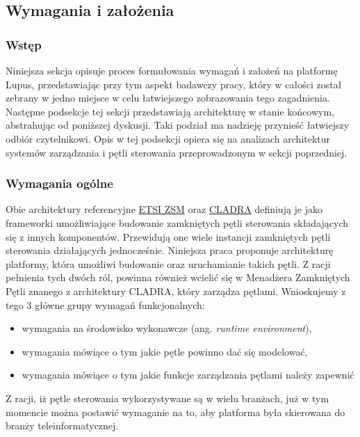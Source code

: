 \subsection{Wymagania i założenia}\label{sec:32}

\subsubsection{Wstęp}

Niniejsza sekcja opisuje proces formułowania wymagań i założeń na platformę Lupus, przedstawiając przy tym aspekt badawczy pracy, który w całości został zebrany w jedno miejsce w celu łatwiejszego zobrazowania tego zagadnienia. Następne podsekcje tej sekcji przedstawiają architekturę w stanie końcowym, abstrahując od poniższej dyskusji. Taki podział ma nadzieję przynieść łatwiejszy odbiór czytelnikowi. Opis w tej podsekcji opiera się na analizach architektur systemów zarządzania i pętli sterowania przeprowadzonym w sekcji poprzedniej.

\subsubsection{Wymagania ogólne}

Obie architektury referencyjne \hyperlink{sec:zsm}{ETSI ZSM} oraz \hyperlink{sec:cladra}{CLADRA} definiują je jako frameworki umożliwiające budowanie zamkniętych pętli sterowania składających się z innych komponentów. Przewidują one wiele instancji zamkniętych pętli sterowania działających jednocześnie. Niniejsza praca proponuje architekturę platformy, która umożliwi budowanie oraz uruchamianie takich pętli. Z racji pełnienia tych dwóch ról, powinna również wcielić się w Menadżera Zamkniętych Pętli znanego z architektury CLADRA, który zarządza pętlami. Wnioskujemy z tego 3 główne grupy wymagań funkcjonalnych:
\begin{itemize}
    \item wymagania na środowisko wykonawcze (ang. \textit{runtime environment}), 
    \item wymagania mówiące o tym jakie pętle powinno dać się modelować,
    \item wymagania mówiące o tym jakie funkcje zarządzania pętlami należy zapewnić
\end{itemize}

Z racji, iż pętle sterowania wykorzystywane są w wielu branżach, już w tym momencie można postawić wymaganie na to, aby platforma była skierowana do branży teleinformatycznej. 

